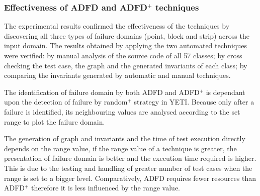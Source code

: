 






\subsubsection{Effectiveness of ADFD and ADFD$^+$ techniques}
The experimental results confirmed the effectiveness of the techniques by discovering all three types of failure domains (point, block and strip) across the input domain. The results obtained by applying the two automated techniques were verified: by manual analysis of the source code of all 57 classes; by cross checking the test case, the graph and the generated invariants of each class; by comparing the invariants generated by automatic and manual techniques. 

The identification of failure domain by both ADFD and ADFD$^+$ is dependant upon the detection of failure by random$^+$ strategy in YETI. Because only after a failure is identified, its neighbouring values are analysed according to the set range to plot the failure domain.

The generation of graph and invariants and the time of test execution directly depends on the range value, if the range value of a technique is greater, the presentation of failure domain is better and the execution time required is higher. This is due to the testing and handling of greater number of test cases when the range is set to a bigger level. Comparatively, ADFD requires fewer resources than ADFD$^+$ therefore it is less influenced by the range value.

